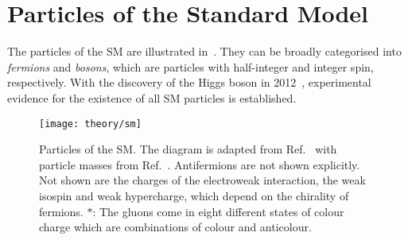 \section{Particles of the Standard Model}%
\label{sec:sm_overview}

The particles of the SM are illustrated in~. They can be
broadly categorised into \emph{fermions} and \emph{bosons}, which are particles
with half-integer and integer spin, respectively. With the discovery of the
Higgs boson in 2012~\cite{HIGG-2012-27,CMS-HIG-12-028}, experimental evidence
for the existence of all SM particles is established.


\begin{figure}[htbp]
  \centering

  \texttt{[image: theory/sm]}

  \caption{Particles of the SM. The diagram is adapted from Ref.~\cite{sm_tikz}
    with particle masses from Ref.~\cite{pdg2020}. Antifermions are not shown
    explicitly.  Not shown are the charges of the electroweak interaction, the
    weak isospin and weak hypercharge, which depend on the chirality of
    fermions. $*$: The gluons come in eight different states of colour charge
    which are combinations of colour and anticolour.}%
  \label{fig:sm_particles}
\end{figure}

